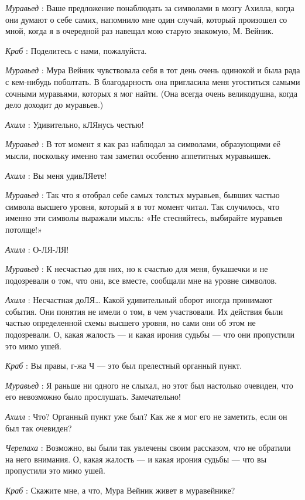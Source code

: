 \documentclass[../main.tex]{subfiles}
\begin{document}
\begin{dialogue}
\emph{Муравьед} : Ваше предложение понаблюдать за символами в мозгу Ахилла, когда они думают о себе самих, напомнило мне один случай, который произошел со мной, когда я в очередной раз навещал мою старую знакомую, М. Вейник.

\emph{Краб} : Поделитесь с нами, пожалуйста.

\emph{Муравьед} : Мура Вейник чувствовала себя в тот день очень одинокой и была рада с кем-нибудь поболтать. В благодарность она пригласила меня угоститься самыми сочными муравьями, которых я мог найти. (Она всегда очень великодушна, когда дело доходит до муравьев.)

\emph{Ахилл} : Удивительно, кЛЯнусь честью!

\emph{Муравьед} : В тот момент я как раз наблюдал за символами, образующими её мысли, поскольку именно там заметил особенно аппетитных муравьишек.

\emph{Ахилл} : Вы меня удивЛЯете!

\emph{Муравьед} : Так что я отобрал себе самых толстых муравьев, бывших частью символа высшего уровня, который я в тот момент читал. Так случилось, что именно эти символы выражали мысль: «Не стесняйтесь, выбирайте муравьев потолще!»

\emph{Ахилл} : О-ЛЯ-ЛЯ!

\emph{Муравьед} : К несчастью для них, но к счастью для меня, букашечки и не подозревали о том, что они, все вместе, сообщали мне на уровне символов.

\emph{Ахилл} : Несчастная доЛЯ\ldots{} Какой удивительный оборот иногда принимают события. Они понятия не имели о том, в чем участвовали. Их действия были частью определенной схемы высшего уровня, но сами они об этом не подозревали. О, какая жалость --- и какая ирония судьбы --- что они пропустили это мимо ушей.

\emph{Краб} : Вы правы, г-жа Ч --- это был прелестный органный пункт.

\emph{Муравьед} : Я раньше ни одного не слыхал, но этот был настолько очевиден, что его невозможно было прослушать. Замечательно!

\emph{Ахилл} : Что? Органный пункт уже был? Как же я мог его не заметить, если он был так очевиден?

\emph{Черепаха} : Возможно, вы были так увлечены своим рассказом, что не обратили на него внимания. О, какая жалость --- и какая ирония судьбы --- что вы пропустили это мимо ушей.

\emph{Краб} : Скажите мне, а что, Мура Вейник живет в муравейнике?


\end{dialogue}
\end{document}
